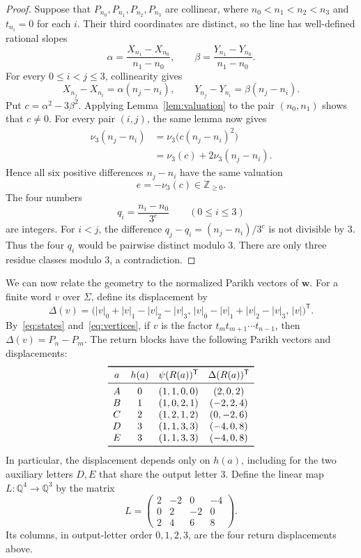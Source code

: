 \documentclass[12pt,reqno]{article}
\newcommand{\Z}{\mathbb Z}
\newcommand{\Q}{\mathbb{Q}}
\newcommand{\ww}{\mathbf{w}}
\DeclareMathOperator{\Par}{\psi}
\begin{document}
\begin{proof}
Suppose that $P_{n_0},P_{n_1},P_{n_2},P_{n_3}$ are collinear, where
$n_0<n_1<n_2<n_3$ and $t_{n_i}=0$ for each $i$. Their third
coordinates are distinct, so the line has well-defined rational slopes
\[
  \alpha=\frac{X_{n_1}-X_{n_0}}{n_1-n_0},\qquad
  \beta=\frac{Y_{n_1}-Y_{n_0}}{n_1-n_0}.
\]
For every $0\leq i<j\leq3$, collinearity gives
\[
 X_{n_j}-X_{n_i}=\alpha(n_j-n_i),\qquad
 Y_{n_j}-Y_{n_i}=\beta(n_j-n_i).
\]
Put $c=\alpha^2-3\beta^2$. Applying
Lemma~\ref{lem:valuation} to the pair $(n_0,n_1)$ shows that $c\ne0$.
For every pair $(i,j)$, the same lemma now gives
\begin{align*}
 \nu_3(n_j-n_i)
 &=\nu_3\bigl(c(n_j-n_i)^2\bigr)\\
 &=\nu_3(c)+2\nu_3(n_j-n_i).
\end{align*}
Hence all six positive differences $n_j-n_i$ have the same valuation
\[
  e=-\nu_3(c)\in\Z_{\geq0}.
\]
The four numbers
\[
  q_i=\frac{n_i-n_0}{3^e}\qquad(0\leq i\leq3)
\]
are integers. For $i<j$, the difference
$q_j-q_i=(n_j-n_i)/3^e$ is not divisible by $3$. Thus the four $q_i$
would be pairwise distinct modulo $3$. There are only three residue
classes modulo $3$, a contradiction.
\end{proof}

We can now relate the geometry to the normalized Parikh vectors of
$\ww$. For a finite word $v$ over $\Sigma$, define its displacement by
\[
  \Delta(v)=\bigl(|v|_0+|v|_1-|v|_2-|v|_3,\,
  |v|_0-|v|_1+|v|_2-|v|_3,\,|v|\bigr)^{\mathsf T}.
\]
By~\eqref{eq:states} and~\eqref{eq:vertices}, if $v$ is the factor
$t_m t_{m+1}\cdots t_{n-1}$, then $\Delta(v)=P_n-P_m$.
The return blocks have the following Parikh vectors and displacements:
\[
\begin{array}{cclc}
\toprule
a & h(a) & \Par(R(a))^{\mathsf T} & \Delta(R(a))^{\mathsf T}\\
\midrule
A&0&(1,1,0,0)&(2,0,2)\\
B&1&(1,0,2,1)&(-2,2,4)\\
C&2&(1,2,1,2)&(0,-2,6)\\
D&3&(1,1,3,3)&(-4,0,8)\\
E&3&(1,1,3,3)&(-4,0,8)\\
\bottomrule
\end{array}
\]
In particular, the displacement depends only on $h(a)$, including for
the two auxiliary letters $D,E$ that share the output letter $3$.
Define the linear map $L:\Q^4\to\Q^3$ by the matrix
\begin{equation}\label{eq:L}
  L=
  \begin{pmatrix}
     2&-2& 0&-4\\
     0& 2&-2& 0\\
     2& 4& 6& 8
  \end{pmatrix}.
\end{equation}
Its columns, in output-letter order $0,1,2,3$, are the four return
displacements above.
\end{document}
